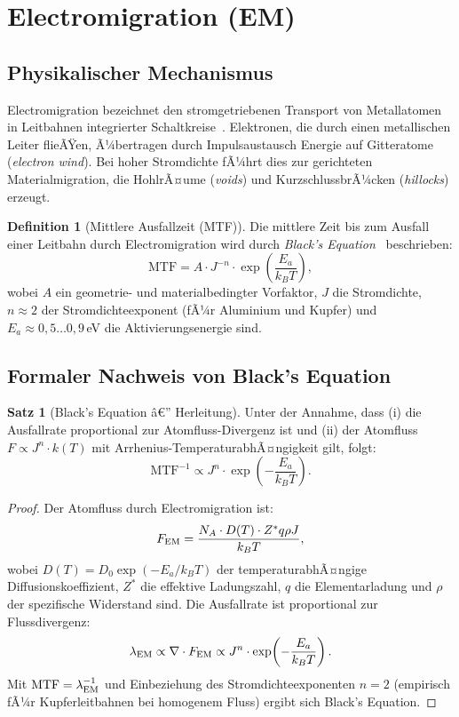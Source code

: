 ﻿\documentclass[a4paper,12pt]{article}
\theoremstyle{definition}
\newtheorem{definition}{Definition}
\newtheorem{satz}{Satz}
\begin{document}
\section{Electromigration (EM)}
\label{sec:em}

\subsection{Physikalischer Mechanismus}

Electromigration bezeichnet den stromgetriebenen Transport von Metallatomen
in Leitbahnen integrierter Schaltkreise~\cite{black1969}. Elektronen, die durch
einen metallischen Leiter flieÃŸen, Ã¼bertragen durch Impulsaustausch Energie auf
Gitteratome (\emph{electron wind}). Bei hoher Stromdichte fÃ¼hrt dies zur
gerichteten Materialmigration, die HohlrÃ¤ume (\emph{voids}) und KurzschlussbrÃ¼cken
(\emph{hillocks}) erzeugt.

\begin{definition}[Mittlere Ausfallzeit (MTF)]
	Die mittlere Zeit bis zum Ausfall einer Leitbahn durch Electromigration wird
	durch \emph{Black's Equation}~\cite{black1969} beschrieben:
	\[
	\mathrm{MTF} = A \cdot J^{-n} \cdot \exp\!\left(\frac{E_a}{k_B T}\right),
	\]
	wobei $A$ ein geometrie- und materialbedingter Vorfaktor, $J$ die Stromdichte,
	$n \approx 2$ der Stromdichteexponent (fÃ¼r Aluminium und Kupfer) und
	$E_a \approx 0{,}5\ldots 0{,}9$\,eV die Aktivierungsenergie sind.
\end{definition}

\subsection{Formaler Nachweis von Black's Equation}

\begin{satz}[Black's Equation â€” Herleitung]
	\label{satz:black}
	Unter der Annahme, dass (i) die Ausfallrate proportional zur
	Atomfluss-Divergenz ist und (ii) der Atomfluss $F \propto J^n \cdot k(T)$
	mit Arrhenius-TemperaturabhÃ¤ngigkeit gilt, folgt:
	\[
	\mathrm{MTF}^{-1} \propto J^n \cdot \exp\!\left(-\frac{E_a}{k_B T}\right).
	\]
\end{satz}

\begin{proof}
	Der Atomfluss durch Electromigration ist:
	\[
	F_{\rm EM} = \frac{N_A \cdot D(T) \cdot Z^* q \rho J}{k_B T},
	\]
	wobei $D(T) = D_0 \exp(-E_a/k_BT)$ der temperaturabhÃ¤ngige Diffusionskoeffizient,
	$Z^*$ die effektive Ladungszahl, $q$ die Elementarladung und $\rho$ der
	spezifische Widerstand sind. Die Ausfallrate ist proportional zur Flussdivergenz:
	\[
	\lambda_{\rm EM} \propto \nabla \cdot F_{\rm EM} \propto J^n \cdot \exp\!\left(-\frac{E_a}{k_B T}\right).
	\]
	Mit $\mathrm{MTF} = \lambda_{\rm EM}^{-1}$ und Einbeziehung des Stromdichteexponenten
	$n=2$ (empirisch fÃ¼r Kupferleitbahnen bei homogenem Fluss) ergibt sich Black's Equation.
	\qedhere
\end{proof}
\end{document}

